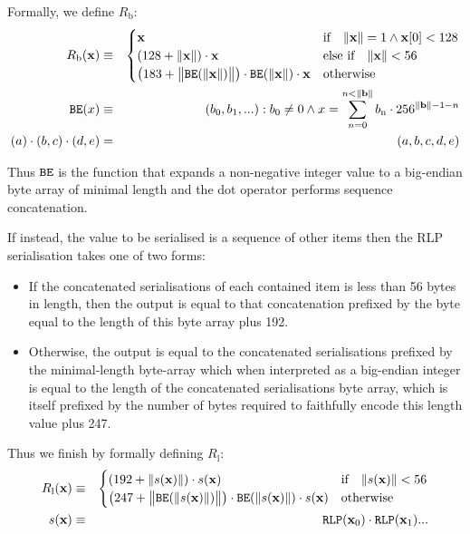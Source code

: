 \documentclass[9pt,oneside]{amsart}
\makeatletter
\newcommand{\linkdest}[1]{\Hy@raisedlink{\hypertarget{#1}{}}}
\makeatother
\begin{document}
\hypertarget{RLP_serialisation_of_a_byte_array_R__b_math_def}{}Formally, we define $R_{\mathrm{b}}$:
\begin{eqnarray}
R_{\mathrm{b}}(\mathbf{x}) & \equiv & \begin{cases}
\mathbf{x} & \text{if} \quad \lVert \mathbf{x} \rVert = 1 \wedge \mathbf{x}[0] < 128 \\
(128 + \lVert \mathbf{x} \rVert) \cdot \mathbf{x} & \text{else if} \quad \lVert \mathbf{x} \rVert < 56 \\
\big(183 + \big\lVert \mathtt{\tiny BE}(\lVert \mathbf{x} \rVert) \big\rVert \big) \cdot \mathtt{\tiny BE}(\lVert \mathbf{x} \rVert) \cdot \mathbf{x} & \text{otherwise}
\end{cases} \\
\mathtt{\tiny BE}(x) & \equiv & (b_0, b_1, ...): b_0 \neq 0 \wedge x = \sum_{n = 0}^{n < \lVert \mathbf{b} \rVert} b_{\mathrm{n}} \cdot 256^{\lVert \mathbf{b} \rVert - 1 - n} \\
(a) \cdot (b, c) \cdot (d, e) & = & (a, b, c, d, e)
\end{eqnarray}

Thus $\mathtt{\tiny BE}$ is the function that expands a non-negative integer value to a big-endian byte array of minimal length and the dot operator performs sequence concatenation.

\hypertarget{RLP_serialisation_of_a_sequence_of_other_items_R__l_word_def}{}\linkdest{R__l}If instead, the value to be serialised is a sequence of other items then the RLP serialisation takes one of two forms:

\begin{itemize}
\item If the concatenated serialisations of each contained item is less than 56 bytes in length, then the output is equal to that concatenation prefixed by the byte equal to the length of this byte array plus 192.
\item Otherwise, the output is equal to the concatenated serialisations prefixed by the minimal-length byte-array which when interpreted as a big-endian integer is equal to the length of the concatenated serialisations byte array, which is itself prefixed by the number of bytes required to faithfully encode this length value plus 247.
\end{itemize}

\hypertarget{RLP_serialisation_of_a_sequence_of_other_items_R__l_math_def}{}Thus we finish by formally defining $R_{\mathrm{l}}$:
\begin{eqnarray}
R_{\mathrm{l}}(\mathbf{x}) & \equiv & \begin{cases}
(192 + \lVert s(\mathbf{x}) \rVert) \cdot s(\mathbf{x}) & \text{if} \quad \lVert s(\mathbf{x}) \rVert < 56 \\
\big(247 + \big\lVert \mathtt{\tiny BE}(\lVert s(\mathbf{x}) \rVert) \big\rVert \big) \cdot \mathtt{\tiny BE}(\lVert s(\mathbf{x}) \rVert) \cdot s(\mathbf{x}) & \text{otherwise}
\end{cases} \\
s(\mathbf{x}) & \equiv & \mathtt{\tiny RLP}(\mathbf{x}_0) \cdot \mathtt{\tiny RLP}(\mathbf{x}_1) ...
\end{eqnarray}
\end{document}
